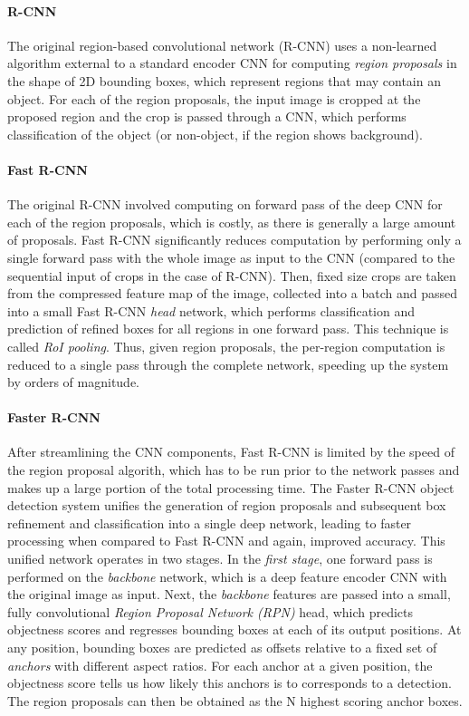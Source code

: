 \paragraph{R-CNN}
The original region-based convolutional network (R-CNN) uses a non-learned algorithm external to a standard encoder CNN
for computing \emph{region proposals} in the shape of 2D bounding boxes, which represent regions that may contain an object.
For each of the region proposals, the input image is cropped at the proposed region and the crop is
passed through a CNN, which performs classification of the object (or non-object, if the region shows background).

\paragraph{Fast R-CNN}
The original R-CNN involved computing on forward pass of the deep CNN for each of the region proposals,
which is costly, as there is generally a large amount of proposals.
Fast R-CNN significantly reduces computation by performing only a single forward pass with the whole image
as input to the CNN (compared to the sequential input of crops in the case of R-CNN).
Then, fixed size crops are taken from the compressed feature map of the image,
collected into a batch and passed into a small Fast R-CNN
\emph{head} network, which performs classification and prediction of refined boxes for all regions in one forward pass.
This technique is called \emph{RoI pooling}. %
Thus, given region proposals, the per-region computation is reduced to a single pass through the complete network,
speeding up the system by orders of magnitude. %

\paragraph{Faster R-CNN}
After streamlining the CNN components, Fast R-CNN is limited by the speed of the region proposal
algorith, which has to be run prior to the network passes and makes up a large portion of the total
processing time.
The Faster R-CNN object detection system unifies the generation of region proposals and subsequent box refinement and
classification into a single deep network, leading to faster processing when compared to Fast R-CNN
and again, improved accuracy.
This unified network operates in two stages.
In the \emph{first stage}, one forward pass is performed on the \emph{backbone} network,
which is a deep feature encoder CNN with the original image as input.
Next, the \emph{backbone} features are passed into a small, fully convolutional \emph{Region Proposal Network (RPN)} head, which
predicts objectness scores and regresses bounding boxes at each of its output positions.
At any position, bounding boxes are predicted as offsets relative to a fixed set of \emph{anchors} with different
aspect ratios.
For each anchor at a given position, the objectness score tells us how likely this anchors is to corresponds to a detection.
The region proposals can then be obtained as the N highest scoring anchor boxes.

